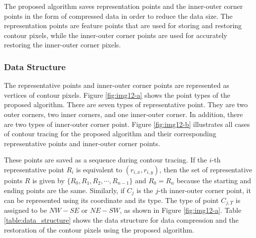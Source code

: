  The proposed algorithm saves representation points and the inner-outer corner points in the form of compressed data in order to reduce the data size. The representation points are feature points that are used for storing and restoring contour pixels, while the inner-outer corner points are used for accurately restoring the inner-outer corner pixels. 

 \subsubsection{Data Structure}

The representative points and inner-outer corner points are represented as vertices of contour pixels. Figure \ref{fig:img12-a} shows the point types of the proposed algorithm. There are seven types of representative point. They are two outer corners, two inner corners, and one inner-outer corner. In addition, there are two types of inner-outer corner point. Figure \ref{fig:img12-b} illustrates all cases of contour tracing for the proposed algorithm and their corresponding representative points and inner-outer corner points. 


 These points are saved as a sequence during contour tracing. If the $i$-th representative point $R_i$ is equivalent to $(r_{i,x}, r_{i,y})$, then the set of representative points $R$ is given by $\{R_0, R_1, R_2, \cdots  , R_{n-1}\}$ and $R_0 = R_n$ because the starting and ending points are the same. Similarly, if $C_j$ is the $j$-th inner-outer corner point, it can be represented using its coordinate and its type. The type of point $C_{j,T}$ is assigned to be $NW-SE$ or $NE-SW$, as shown in Figure \ref{fig:img12-a}. Table \ref{table:data_structure} shows the data structure for data compression and the restoration of the contour pixels using the proposed algorithm. 

